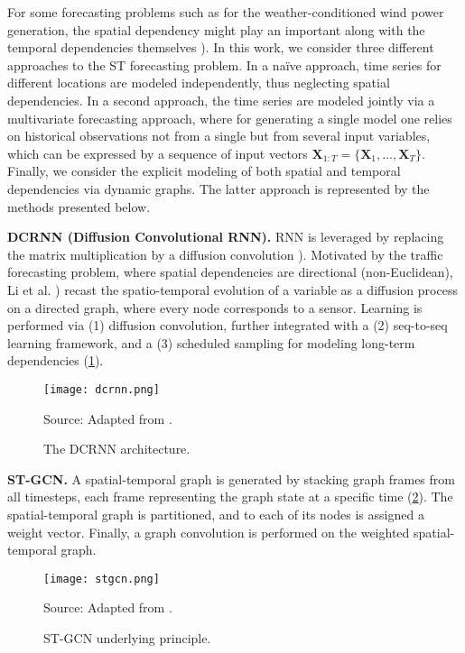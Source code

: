 For some forecasting problems such as for the weather-conditioned wind power generation, the spatial dependency might play an important along with the temporal dependencies themselves \cite{engeland2017variability}). In this work, we consider three different approaches to the ST forecasting problem. In a naïve approach, time series for different locations are modeled independently, thus neglecting spatial dependencies. In a second approach, the time series are modeled jointly via a multivariate forecasting approach, where for generating a single model one relies on historical observations not from a single but from several input variables, which can be expressed by a sequence of input vectors $\boldsymbol{X}_{1:T} = \{\boldsymbol{X}_1, ..., \boldsymbol{X}_T\}$.  Finally, we consider the explicit modeling of both spatial and temporal dependencies via dynamic graphs. The latter approach is represented by the methods presented below.

\vspace{1em}
\noindent
\textbf{DCRNN (Diffusion Convolutional RNN).} RNN is leveraged by replacing the matrix multiplication by a diffusion convolution \cite{liu2020intro}). Motivated by the traffic forecasting problem, where spatial dependencies are directional (non-Euclidean), Li et al. \cite{li2018dcrnn}) recast the spatio-temporal evolution of a variable as a diffusion process on a directed graph, where every node corresponds to a sensor. Learning is performed via (1) diffusion convolution, further integrated with a (2) seq-to-seq learning framework, and a (3) scheduled sampling for modeling long-term dependencies (\ref{fig:dcrnn}).
\begin{figure}[H]
	\centering
 	\caption{The DCRNN architecture.}
	\texttt{[image: dcrnn.png]}  \\
    \raggedright
    Source: Adapted from \cite{li2018dcrnn}.
	\label{fig:dcrnn}
\end{figure}

\noindent
\textbf{ST-GCN.} A spatial-temporal graph is generated by stacking graph frames from all timesteps, each frame representing the graph state at a specific time (\ref{fig:stgcn}). The spatial-temporal graph is partitioned, and to each of its nodes is assigned a weight vector. Finally, a graph convolution is performed on the weighted spatial-temporal graph.
\begin{figure}[H]
	\centering
 	\caption{ST-GCN underlying principle.}
	\texttt{[image: stgcn.png]}  \\
    \raggedright
    Source: Adapted from \cite{liu2019st-mgcn}.
	\label{fig:stgcn}
\end{figure}

